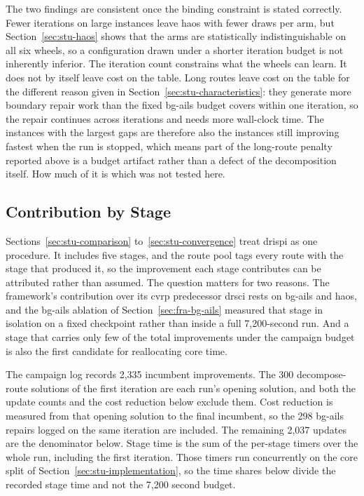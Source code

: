 The two findings are consistent once the binding constraint is stated
correctly. Fewer iterations on large instances leave \gls{haos} with fewer draws per
arm, but Section~\ref{sec:stu-haos} shows that the arms are statistically
indistinguishable on all six wheels, so a configuration drawn under a shorter
iteration budget is not inherently inferior. The iteration count
constrains what the wheels can learn. It does not by itself leave cost on the
table. Long routes leave cost on the table for the different reason given in
Section~\ref{sec:stu-characteristics}: they generate more boundary repair
work than the fixed \gls{bg-ails} budget covers within one iteration, so the repair
continues across iterations and needs more wall-clock time. The instances with the largest gaps are therefore also the instances still
improving fastest when the run is stopped, which means part of the long-route
penalty reported above is a budget artifact rather than a defect of the
decomposition itself. How much of it is which was not tested here.

\subsection{Contribution by Stage}
\label{sec:stu-sources}

Sections~\ref{sec:stu-comparison} to~\ref{sec:stu-convergence} treat
\gls{drispi} as one procedure. It includes five stages, and the route pool tags every
route with the stage that produced it, so the improvement each stage contributes can be attributed rather than assumed. The
question matters for two reasons. The framework's contribution over its \gls{cvrp} 
predecessor \gls{drsci} \citep{altendeiteringDRSCICVRP2026} rests on \gls{bg-ails} and \gls{haos}, and the \gls{bg-ails} ablation of Section~\ref{sec:fra-bg-ails} measured that stage in isolation
on a fixed checkpoint rather than inside a full 7,200-second run. And a stage that
carries only few of the total improvements under the campaign budget is also the
first candidate for reallocating core time.

The campaign log records 2,335 incumbent improvements. The 300 decompose-route solutions of the first iteration are each run's opening solution, and both the update counts and the cost reduction below exclude them. Cost reduction is measured from that opening solution to the final incumbent, so the 298 \gls{bg-ails} repairs logged on the same iteration are included. The remaining 2,037 updates are the denominator below. Stage time is the sum of the
per-stage timers over the whole run, including the first iteration. Those timers run concurrently on the core split of Section~\ref{sec:stu-implementation}, so the time shares below divide the recorded stage time and not the 7,200 second budget.

